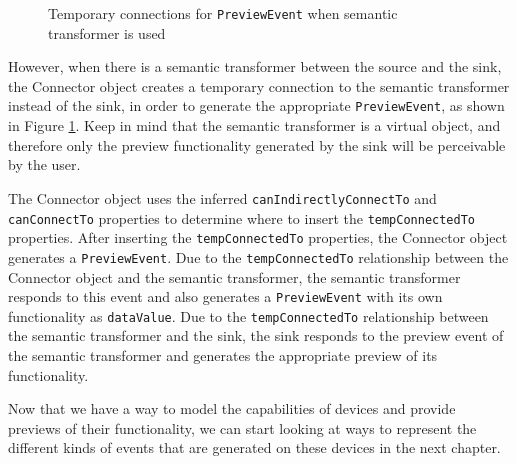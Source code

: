 \begin{figure}[bth]
	\caption{Temporary connections for \texttt{PreviewEvent} when semantic transformer is used}
	\label{stPreview}        
\end{figure}

However, when there is a semantic transformer between the source and the sink, the Connector object creates a temporary connection to the semantic transformer instead of the sink, in order to generate the appropriate \texttt{PreviewEvent}, as shown in Figure \ref{stPreview}. Keep in mind that the semantic transformer is a virtual object, and therefore only the preview functionality generated by the sink will be perceivable by the user.

The Connector object uses the inferred \texttt{canIndirectlyConnectTo} and \texttt{canConnectTo} properties to determine where to insert the \texttt{temp\-Connected\-To} properties. After inserting the \texttt{tempConnectedTo} properties, the Connector object generates a \texttt{PreviewEvent}. Due to the \texttt{tempConnectedTo} relationship between the Connector object and the semantic transformer, the semantic transformer responds to this event and also generates a \texttt{PreviewEvent} with its own functionality as \texttt{data\-Value}. Due to the \texttt{tempConnectedTo} relationship between the semantic transformer and the sink, the sink responds to the preview event of the semantic transformer and generates the appropriate preview of its functionality.

Now that we have a way to model the capabilities of devices and provide previews of their functionality, we can start looking at ways to represent the different kinds of events that are generated on these devices in the next chapter.
